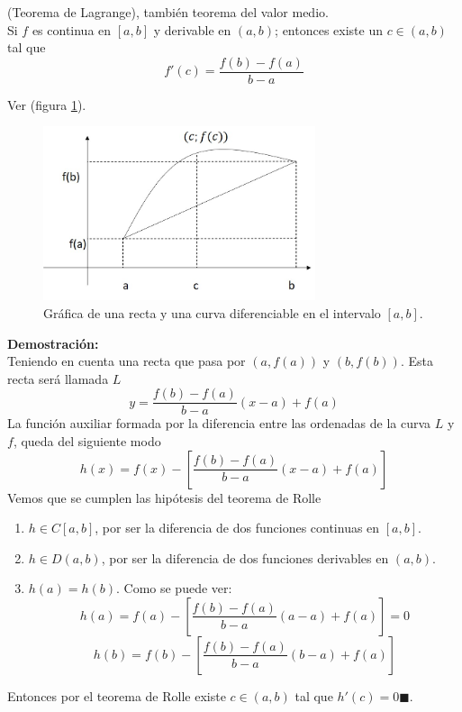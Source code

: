 \documentclass[10pt,twoside]{SelfArx} %
\begin{document}
 
  
 \begin{teorema}
 	(Teorema de Lagrange), también teorema del valor medio.\\
 	Si $ f $ es continua en $ [a,b] $ y derivable en $ (a,b) $; entonces existe un $ c\in(a,b) $ tal que 
 	\begin{equation}
 	f'(c)=\dfrac{f(b)-f(a)}{b-a}\label{valorMedio}
 	\end{equation}
  \end{teorema}
 Ver (figura \ref{lagrange1}).\\
 \begin{figure}[h]
 	\centering
 	\includegraphics[width=8cm]{lagrange1}
 	\caption{Gráfica de una recta y una curva diferenciable en el intervalo $ [a,b] $.}
 	\label{lagrange1}
 \end{figure}
 \textbf{Demostración:}\\
 Teniendo en cuenta una recta que pasa por $ (a,f(a)) $ y $ (b,f(b)) $. Esta recta será llamada $ L $
 \begin{equation}
 y=\dfrac{f(b)-f(a)}{b-a}(x-a)+f(a)
 \end{equation}
 La función auxiliar formada por la diferencia entre las ordenadas de la curva $ L $ y $ f $, queda del siguiente modo
 \begin{equation}
 h(x)=f(x)-\left [ \dfrac{f(b)-f(a)}{b-a}(x-a)+f(a)\right ]
 \end{equation}
 Vemos que se cumplen  las hipótesis del teorema de Rolle
 \begin{enumerate}
 	\item $ h\in C[a,b] $, por ser la diferencia de dos funciones continuas en $ [a,b] $.
 	\item $ h\in D(a,b) $, por ser la diferencia de dos funciones derivables en $ (a,b) $.
 	\item $ h(a)=h(b) $. 
 	Como se puede ver:
 	\[ h(a)=f(a)-\left [ \dfrac{f(b)-f(a)}{b-a}(a-a)+f(a)\right ]=0 \]
 	\[ h(b)=f(b)-\left [ \dfrac{f(b)-f(a)}{b-a}(b-a)+f(a)\right ] \]
 \end{enumerate}
 Entonces por el teorema de Rolle existe $ c\in(a,b) $ tal que $ h'(c)=0 \blacksquare$.\\
 
\end{document}
